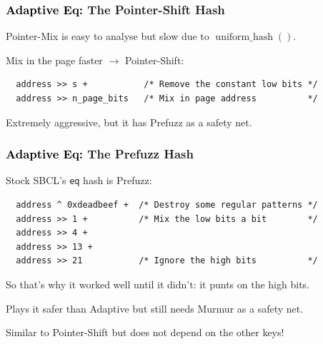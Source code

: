 \documentclass[onlytextwidth,usepdftitle=false]{beamer}
\newcommand\fn[1]{\operatorname{#1}}
\newcommand\inlinett[1]{\texttt{\fontsize{10pt}{12pt}\selectfont #1}}
\newcommand\Adaptive{Ad\hspace{-0.06em}aptive}
\newcommand*\lisp[1]{\inlinett{#1}}
\newcommand\mglconclusion[1]{\textcolor{mglred2}{\textbf{\maltese} #1}}
\begin{document}
\begin{frame}[fragile]
\frametitle{\textcolor{black}{\Adaptive{} Eq:} The Pointer-Shift Hash}
Pointer-Mix is easy to analyse but slow due to $\fn{uniform\_hash}()$.

Mix in the page faster $\rightarrow$ Pointer-Shift:
{
\begin{verbatim}
  address >> s +           /* Remove the constant low bits */
  address >> n_page_bits   /* Mix in page address          */
\end{verbatim}
}
Extremely aggressive, but it has Prefuzz as a safety net.
\end{frame}

\begin{frame}[fragile]
\frametitle{\textcolor{black}{\Adaptive{} Eq:} The Prefuzz Hash}
Stock SBCL's \lisp{eq} hash is Prefuzz:

{
\begin{verbatim}
  address ^ 0xdeadbeef +  /* Destroy some regular patterns */
  address >> 1 +          /* Mix the low bits a bit        */
  address >> 4 +
  address >> 13 +
  address >> 21           /* Ignore the high bits          */
\end{verbatim}
}
So that's why it worked well until it didn't: it punts on the high bits.

Plays it safer than Adaptive but still needs Murmur as a safety net.

\mglconclusion{Similar to Pointer-Shift but does not depend on the other keys!}
\end{frame}
\end{document}
